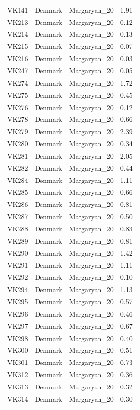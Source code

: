 \begin{longtable}[t]{lllr}
VK141 & Denmark & Margaryan\_20 & 1.91\\
VK213 & Denmark & Margaryan\_20 & 0.12\\
VK214 & Denmark & Margaryan\_20 & 0.13\\
VK215 & Denmark & Margaryan\_20 & 0.07\\
VK216 & Denmark & Margaryan\_20 & 0.03\\
VK247 & Denmark & Margaryan\_20 & 0.05\\
VK274 & Denmark & Margaryan\_20 & 1.72\\
VK275 & Denmark & Margaryan\_20 & 0.45\\
VK276 & Denmark & Margaryan\_20 & 0.12\\
VK278 & Denmark & Margaryan\_20 & 0.66\\
VK279 & Denmark & Margaryan\_20 & 2.39\\
VK280 & Denmark & Margaryan\_20 & 0.34\\
VK281 & Denmark & Margaryan\_20 & 2.05\\
VK282 & Denmark & Margaryan\_20 & 0.44\\
VK284 & Denmark & Margaryan\_20 & 1.11\\
VK285 & Denmark & Margaryan\_20 & 0.66\\
VK286 & Denmark & Margaryan\_20 & 0.81\\
VK287 & Denmark & Margaryan\_20 & 0.50\\
VK288 & Denmark & Margaryan\_20 & 0.83\\
VK289 & Denmark & Margaryan\_20 & 0.81\\
VK290 & Denmark & Margaryan\_20 & 1.42\\
VK291 & Denmark & Margaryan\_20 & 1.11\\
VK292 & Denmark & Margaryan\_20 & 0.10\\
VK294 & Denmark & Margaryan\_20 & 1.13\\
VK295 & Denmark & Margaryan\_20 & 0.57\\
VK296 & Denmark & Margaryan\_20 & 0.46\\
VK297 & Denmark & Margaryan\_20 & 0.67\\
VK298 & Denmark & Margaryan\_20 & 0.40\\
VK300 & Denmark & Margaryan\_20 & 0.51\\
VK301 & Denmark & Margaryan\_20 & 0.73\\
VK312 & Denmark & Margaryan\_20 & 0.36\\
VK313 & Denmark & Margaryan\_20 & 0.32\\
VK314 & Denmark & Margaryan\_20 & 0.30\\

\end{longtable}
